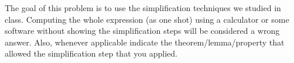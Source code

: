 \documentclass[12pt]{article}
\begin{document}
 The goal of this problem is to use the simplification techniques we studied in class. Computing the whole expression (as one shot) using a calculator or some software without showing the simplification steps will be considered a wrong answer. Also, whenever applicable indicate the theorem/lemma/property that allowed the simplification step that you applied. \\
\end{document}
